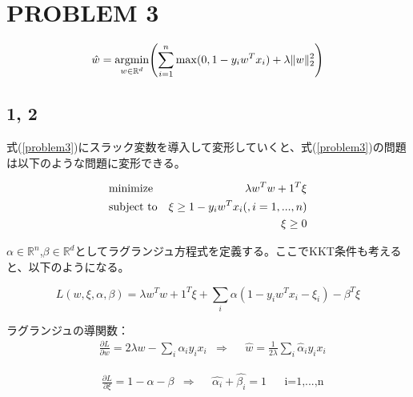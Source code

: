 \documentclass[a4j,11pt]{jarticle}
\newcommand{\argmin}{\mathop{\rm argmin}\limits}
\begin{document}
\newpage
\section{PROBLEM 3}

\begin{equation}
    \hat{w} = \argmin_{w\in \mathbb{R}^d} \Biggl(\sum_{i=1}^{n}\max(0,1-y_iw^Tx_i) + \lambda \|w\|^2_2 \Biggr) \label{problem3}
\end{equation}

\subsection*{1, 2}
式(\ref{problem3})にスラック変数を導入して変形していくと、式(\ref{problem3})の問題は以下のような問題に変形できる。

\begin{equation}
    \begin{aligned}
        & \text{minimize}
            & \lambda w^Tw + 1^T\xi\\
        &\text{subject to}
            & \xi \geq 1-y_iw^Tx_i \text(,i = 1,...,n)\\
            & & \xi \geq 0\\
    \end{aligned}
\end{equation}

$\alpha \in \mathbb{R}^n$,$\beta \in \mathbb{R}^d$としてラグランジュ方程式を定義する。ここでKKT条件も考えると、以下のようになる。

\begin{equation}
    L(w,\xi,\alpha,\beta) = \lambda w^Tw + 1^T\xi + \sum_{i}\alpha (1-y_iw^Tx_i-\xi_i)-\beta^T\xi
\end{equation}

ラグランジュの導関数：
\begin{equation}
    \begin{aligned}
        &\frac{\partial L}{\partial w} = 2\lambda w- \sum_i \alpha_i y_i x_i
        &\Rightarrow 
        &&\hat{w} = \frac{1}{2\lambda}\sum_i\hat{\alpha}_i y_i x_i
    \end{aligned}
\end{equation}

\begin{equation}
    \begin{aligned}
        &\frac{\partial L}{\partial \xi} = 1-\alpha-\beta
        &\Rightarrow
        &&\hat{\alpha_i} + \hat{\beta_i} = 1 
        &&\text{i=1,...,n}
    \end{aligned}
\end{equation}
\end{document}
